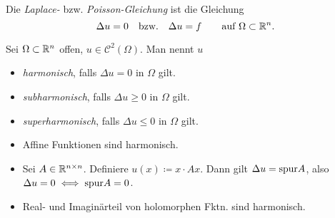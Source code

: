 \documentclass{cheat-sheet}
\newcommand{\dive}{\mathrm{div}} %
\begin{document}
\begin{defn}
  Die \emph{Laplace-} bzw. \emph{Poisson-Gleichung} ist die Gleichung
  \[ \Delta u = 0 \quad \text{bzw.} \quad \Delta u = f \qquad \text{auf $\Omega \subset \mathbb{R}^n$}. \]
\end{defn}


\iffalse
  Physikalische Motivation/Herleitung

  Beschreibung von Gleichgewichtszuständen von physikalischen Zuständen $u$ (Temperatur / Konzentration)

  Gleichgewicht: "`Nettofluss"' durch den Rand $V \subset \Omega$:
  Jedes (glatt berandete) Testvolumen verschwindet.

  $F \coloneqq Flussdichte von $u

  $0 = \Int{\partial V}{}{F \circ \nu}{S} \overset{\text{Gauss}}{=} \Int{V}{}{\dive F}{x}$

  Es folgt: $\dive F = 0$, da $V$ beliebig

  Typischerweise $F = -a Du$ ($a > 0$).

  Es folgt: $-a \Delta u = 0$

  In der Physik: Diffusion von Feldern, 1. Ficksche Gesetz, Wärmeleitung, Fouriersches Gesetz

  Definition von harmonischen Funktionen und der Fundamentallösung
\fi

\begin{defn}
  Sei $\Omega \subset \mathbb{R}^n$ offen, $u \in \mathcal{C}^2(\Omega)$. Man nennt $u$
  \begin{itemize}
    \item \emph{harmonisch}, falls $\Delta u = 0$ in $\Omega$ gilt.
    \item \emph{subharmonisch}, falls $\Delta u \geq 0$ in $\Omega$ gilt.
    \item \emph{superharmonisch}, falls $\Delta u \leq 0$ in $\Omega$ gilt.
  \end{itemize}
\end{defn}

\begin{bspe}
  \begin{itemize}
    \item Affine Funktionen sind harmonisch.
    \item Sei $A \in \mathbb{R}^{n \times n}$. Definiere $u(x) \coloneqq x \cdot Ax$. Dann gilt $\Delta u = \mathrm{spur} A$, also $\Delta u = 0 \iff \mathrm{spur} A = 0$.
    \item Real- und Imaginärteil von holomorphen Fktn. sind harmonisch.
  \end{itemize}
\end{bspe}
\end{document}
